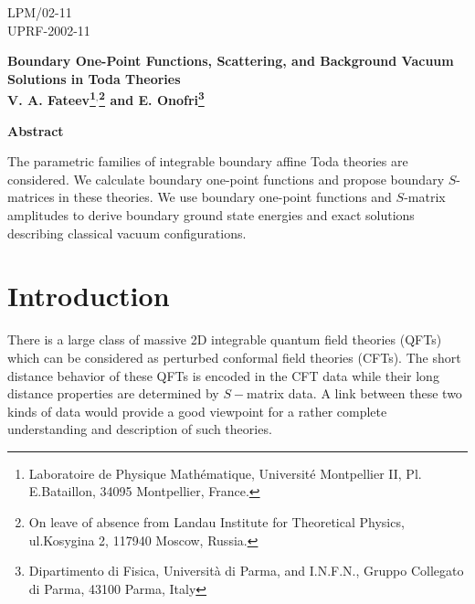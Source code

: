 \documentclass[a4paper,12pt,titlepage,final]{article}
\begin{document}
  \begin{titlepage}
    \begin{flushright}
{\small\sf LPM/02-11\\
      UPRF-2002-11}
    \end{flushright}
    \begin{center}
\textbf{\Large Boundary One-Point Functions, Scattering, and
Background Vacuum Solutions in Toda Theories}\\[2.em] \textbf{\large
V. A. Fateev\footnote{Laboratoire de Physique Math\'{e}matique,
Universit\'{e} Montpellier II, Pl. E.Bataillon, 34095 Montpellier,
France.}$^,$\footnote{On leave of absence from Landau Institute for
Theoretical Physics, ul.Kosygina 2, 117940 Moscow, Russia.}
\hspace{0.2cm} and E. Onofri\footnote{Dipartimento di Fisica,
Universit\`a di
Parma, and {\small\sf I.N.F.N.}, Gruppo Collegato di Parma, 43100 Parma,
Italy}
}\\[5.em]
\end{center}

\date{}


\bigskip
\bigskip

\begin{center}
\textbf{Abstract}
\end{center}
\bigskip
The parametric families of integrable boundary affine Toda theories are
considered. We calculate boundary one-point functions and propose boundary
$S$-matrices in these theories. We use boundary one-point functions and
$S$-matrix amplitudes to derive boundary ground state energies and exact
solutions describing classical vacuum configurations.

 \end{titlepage}

\section{ Introduction}

There is a large class of massive 2D integrable quantum field theories
(QFTs) which can be considered as perturbed conformal field theories (CFTs).
The short distance behavior of these QFTs is encoded in the CFT data while
their long distance properties are determined by $S-$matrix data. A link
between these two kinds of data would provide a good viewpoint for a rather
complete understanding and description of such theories.
\end{document}
